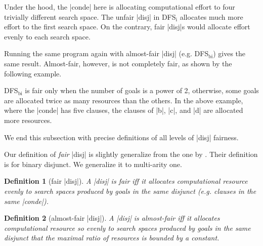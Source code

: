 \documentclass[format=acmlarge, review=true, authordraft=true]{acmart}
\newtheorem{defn}{Definition}[section]
\newcommand{\dfsi}[0]{DFS$_\textrm{i}$}
\begin{document}
Under the hood, the \scheme|conde| here is allocating computational effort to 
four trivially different search space. The unfair \scheme|disj| in 
\dfsi{} allocates much more effort to the first search space. On the contrary, 
fair \scheme|disj|s would allocate effort evenly to each search space.

\begin{center}
    \begin{schemeregion}
    \end{schemeregion}
\end{center}

\begin{center}
    \begin{schemeregion}
    \end{schemeregion}
\end{center}

Running the same program again with almost-fair \scheme|disj| 
(e.g. DFS$_\textrm{bi}$) gives the same result. Almost-fair, however, is not 
completely fair, as shown by the following example. 

\begin{center}
    \begin{schemeregion}
    \end{schemeregion}
\end{center}

DFS$_\textrm{bi}$ is fair only when the number of goals is a power of 2, 
otherwise, some goals are allocated twice as many resources than the others. In 
the above example, where the \scheme|conde| has five clauses, the clauses of 
\scheme|b|, \scheme|c|, and \scheme|d| are allocated more resources.

We end this subsection with precise definitions of all levels of 
\scheme|disj| fairness.

Our definition of \emph{fair} \scheme|disj| is slightly generalize from the one 
by \citet{seres1999algebra}. Their definition is for binary disjunct. We 
generalize it to multi-arity one.

\begin{defn}[fair \scheme|disj|]
A \scheme|disj| is fair iff it allocates computational resource evenly to 
search spaces produced by goals in the same disjunct (e.g. clauses in the 
same 
\scheme|conde|).
\end{defn}

\begin{defn}[almost-fair \scheme|disj|]
A \scheme|disj| is almost-fair iff it allocates computational resource so 
evenly to search spaces produced by goals in the same disjunct that the maximal 
ratio of resources is bounded by a constant.
\end{defn}
\end{document}
